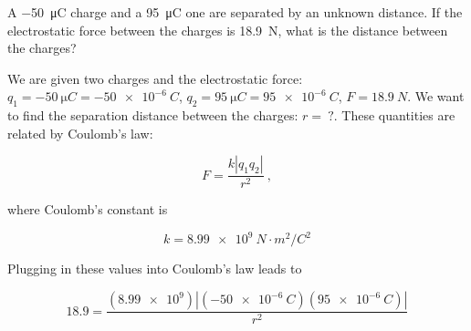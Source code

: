 \documentclass[dvipsnames]{article}
\numberwithin{equation}{section}
\numberwithin{figure}{section}
\begin{document}

\cyanhrule
\clearpage
\begin{example}
    A \SI{-50}{\micro C} charge and a \SI{95}{\micro C} one are separated by an unknown distance. If the electrostatic force between the charges is \SI{18.9}{N}, what is the distance between the charges?
\end{example}

\begin{center}
\end{center}

\Solution We are given two charges and the electrostatic force: $q_1 = \SI{-50}{\micro C} = \qty{-50e-6}{C}$, $q_2 = \SI{95}{\micro C} = \qty{95e-6}{C}$, $F = \SI{18.9}{N}$. We want to find the separation distance between the charges: $r =\ ?$. These quantities are related by Coulomb's law:

\begin{equation*}
    F = \frac{k |q_1 q_2|}{r^2}\ ,
\end{equation*}

where Coulomb's constant is

\begin{equation*}
    k = \SI{8.99e9}{N \cdot m^2/C^2}
\end{equation*}

Plugging in these values into Coulomb's law leads to 

\begin{equation*}
    18.9 = \frac{(\num{8.99e9}) \left|(\qty{-50e-6}{C})(\qty{95e-6}{C})\right|}{r^2}
\end{equation*} 
\end{document}
